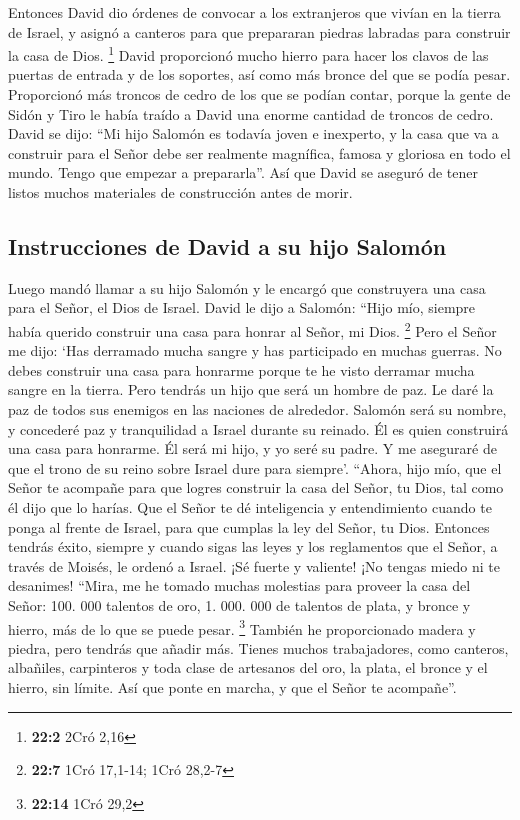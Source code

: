  Entonces David dio órdenes de convocar a los extranjeros
que vivían en la tierra de Israel, y asignó a canteros para que
prepararan piedras labradas para construir la casa de Dios. \footnote{\textbf{22:2}
  2Cró 2,16}  David proporcionó mucho hierro para hacer
los clavos de las puertas de entrada y de los soportes, así como más
bronce del que se podía pesar.  Proporcionó más troncos de
cedro de los que se podían contar, porque la gente de Sidón y Tiro le
había traído a David una enorme cantidad de troncos de cedro.
 David se dijo: ``Mi hijo Salomón es todavía joven e
inexperto, y la casa que va a construir para el Señor debe ser realmente
magnífica, famosa y gloriosa en todo el mundo. Tengo que empezar a
prepararla''. Así que David se aseguró de tener listos muchos materiales
de construcción antes de morir.

\hypertarget{instrucciones-de-david-a-su-hijo-salomuxf3n}{%
\subsection{Instrucciones de David a su hijo
Salomón}\label{instrucciones-de-david-a-su-hijo-salomuxf3n}}

 Luego mandó llamar a su hijo Salomón y le encargó que
construyera una casa para el Señor, el Dios de Israel. 
David le dijo a Salomón: ``Hijo mío, siempre había querido construir una
casa para honrar al Señor, mi Dios. \footnote{\textbf{22:7} 1Cró
  17,1-14; 1Cró 28,2-7}  Pero el Señor me dijo: `Has
derramado mucha sangre y has participado en muchas guerras. No debes
construir una casa para honrarme porque te he visto derramar mucha
sangre en la tierra.  Pero tendrás un hijo que será un
hombre de paz. Le daré la paz de todos sus enemigos en las naciones de
alrededor. Salomón será su nombre, y concederé paz y tranquilidad a
Israel durante su reinado.  Él es quien construirá una
casa para honrarme. Él será mi hijo, y yo seré su padre. Y me aseguraré
de que el trono de su reino sobre Israel dure para siempre'.
 ``Ahora, hijo mío, que el Señor te acompañe para que
logres construir la casa del Señor, tu Dios, tal como él dijo que lo
harías.  Que el Señor te dé inteligencia y entendimiento
cuando te ponga al frente de Israel, para que cumplas la ley del Señor,
tu Dios.  Entonces tendrás éxito, siempre y cuando sigas
las leyes y los reglamentos que el Señor, a través de Moisés, le ordenó
a Israel. ¡Sé fuerte y valiente! ¡No tengas miedo ni te desanimes!
 ``Mira, me he tomado muchas molestias para proveer la
casa del Señor: 100. 000 talentos de oro, 1. 000. 000 de talentos de
plata, y bronce y hierro, más de lo que se puede pesar. \footnote{\textbf{22:14}
  1Cró 29,2}  También he proporcionado madera y piedra,
pero tendrás que añadir más.  Tienes muchos trabajadores,
como canteros, albañiles, carpinteros y toda clase de artesanos del oro,
la plata, el bronce y el hierro, sin límite. Así que ponte en marcha, y
que el Señor te acompañe''.

